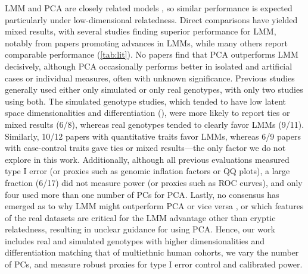 \documentclass[11pt]{article}
\begin{document}
\begin{linenumbers}
LMM and PCA are closely related models \citep{astle_population_2009, janss_inferences_2012, hoffman_correcting_2013, zhang_principal_2015}, so similar performance is expected particularly under low-dimensional relatedness.
Direct comparisons have yielded mixed results, with several studies finding superior performance for LMM, notably from papers promoting advances in LMMs, while many others report comparable performance (\cref{tab:lit}).
No papers find that PCA outperforms LMM decisively, although PCA occasionally performs better in isolated and artificial cases or individual measures, often with unknown significance.
Previous studies generally used either only simulated or only real genotypes, with only two studies using both.
The simulated genotype studies, which tended to have low latent space dimensionalities and differentiation (\Fst), were more likely to report ties or mixed results (6/8), whereas real genotypes tended to clearly favor LMMs (9/11).
Similarly, 10/12 papers with quantitative traits favor LMMs, whereas 6/9 papers with case-control traits gave ties or mixed results---the only factor we do not explore in this work.
Additionally, although all previous evaluations measured type I error (or proxies such as genomic inflation factors \citep{devlin_genomic_1999} or QQ plots), a large fraction (6/17) did not measure power (or proxies such as ROC curves), and only four used more than one number of PCs for PCA.
Lastly, no consensus has emerged as to why LMM might outperform PCA or vice versa \citep{price_new_2010, sul_mixed_2013, price_response_2013, hoffman_correcting_2013}, or which features of the real datasets are critical for the LMM advantage other than cryptic relatedness, resulting in unclear guidance for using PCA.
Hence, our work includes real and simulated genotypes with higher dimensionalities and differentiation matching that of multiethnic human cohorts, we vary the number of PCs, and measure robust proxies for type I error control and calibrated power.


\end{linenumbers}
\end{document}
